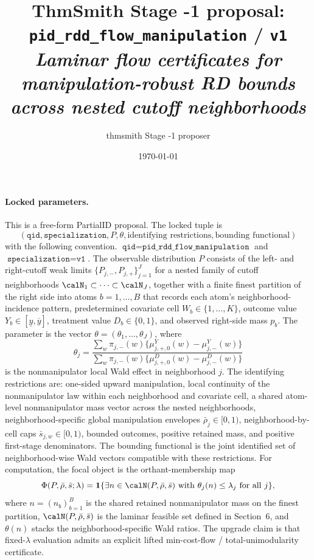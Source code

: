 \documentclass[11pt]{article}
\title{ThmSmith Stage -1 proposal: \texttt{pid\_rdd\_flow\_manipulation} / \texttt{v1}%
  \\ \large\textit{Laminar flow certificates for manipulation-robust RD bounds across nested cutoff neighborhoods}}
\author{thmsmith Stage -1 proposer}
\date{\today}
\newcommand{\one}{\mathbf{1}}
\theoremstyle{definition}
\theoremstyle{plain}
\theoremstyle{remark}
\begin{document}
\maketitle


\paragraph{Locked parameters.}
This is a free-form PartialID proposal.  The locked tuple is
\[
  (\texttt{qid}, \texttt{specialization}, P, \theta, \text{identifying restrictions},
    \text{bounding functional})
\]
with the following convention.  \(\texttt{qid}=\texttt{pid\_rdd\_flow\_manipulation}\) and
\(\texttt{specialization}=\texttt{v1}\).  The observable distribution \(P\) consists of the
left- and right-cutoff weak limits \(\{P_{j,-},P_{j,+}\}_{j=1}^J\) for a nested family of
cutoff neighborhoods \(\calN_1\subset\cdots\subset\calN_J\), together with a finite finest
partition of the right side into atoms \(b=1,\ldots,B\) that records each atom's
neighborhood-incidence pattern, predetermined covariate cell \(W_b\in\{1,\ldots,K\}\),
outcome value \(Y_b\in[\underline y,\overline y]\), treatment value \(D_b\in\{0,1\}\), and
observed right-side mass \(p_b\).  The parameter is the vector
\(\theta=(\theta_1,\ldots,\theta_J)\), where
\[
  \theta_j=
  \frac{\sum_w \pi_{j,-}(w)\{\mu^Y_{j,+,0}(w)-\mu^Y_{j,-}(w)\}}
       {\sum_w \pi_{j,-}(w)\{\mu^D_{j,+,0}(w)-\mu^D_{j,-}(w)\}}
\]
is the nonmanipulator local Wald effect in neighborhood \(j\).  The identifying restrictions
are: one-sided upward manipulation, local continuity of the nonmanipulator law within each
neighborhood and covariate cell, a shared atom-level nonmanipulator mass vector across the
nested neighborhoods, neighborhood-specific global manipulation envelopes
\(\bar\rho_j\in[0,1)\), neighborhood-by-cell caps \(\bar s_{j,w}\in[0,1)\), bounded outcomes,
positive retained mass, and positive first-stage denominators.  The bounding functional is the
joint identified set of neighborhood-wise Wald vectors compatible with these restrictions.
For computation, the focal object is the orthant-membership map
\[
  \Phi(P,\bar\rho,\bar s;\lambda)
  =\one\{\exists n\in\calN(P,\bar\rho,\bar s)\text{ with }\theta_j(n)\le \lambda_j
  \text{ for all }j\},
\]
where \(n=(n_b)_{b=1}^B\) is the shared retained nonmanipulator mass on the finest partition,
\(\calN(P,\bar\rho,\bar s)\) is the laminar feasible set defined in Section~6, and
\(\theta(n)\) stacks the neighborhood-specific Wald ratios.  The upgrade claim is that
fixed-\(\lambda\) evaluation admits an explicit lifted min-cost-flow / total-unimodularity
certificate.
\end{document}

